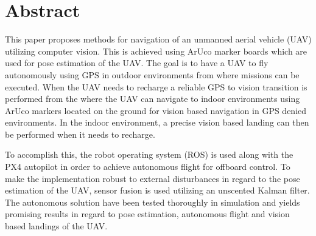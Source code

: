 \documentclass[../Head/report.tex]{subfiles}
\begin{document}
\thispagestyle{empty}
\section*{Abstract}

This paper proposes methods for navigation of an unmanned aerial vehicle (UAV) utilizing computer vision. This is achieved using ArUco marker boards which are used for pose estimation of the UAV. The goal is to have a UAV to fly autonomously using GPS in outdoor environments from where missions can be executed. When the UAV needs to recharge a reliable GPS to vision transition is performed from the where the UAV can navigate to indoor environments using ArUco markers located on the ground for vision based navigation in GPS denied environments. In the indoor environment, a precise vision based landing can then be performed when it needs to recharge. 

To accomplish this, the robot operating system (ROS) is used along with the PX4 autopilot in order to achieve autonomous flight for offboard control. To make the implementation robust to external disturbances in regard to the pose estimation of the UAV, sensor fusion is used utilizing an unscented Kalman filter. The autonomous solution have been tested thoroughly in simulation and yields promising results in regard to pose estimation, autonomous flight and vision based landings of the UAV.   
\end{document}
